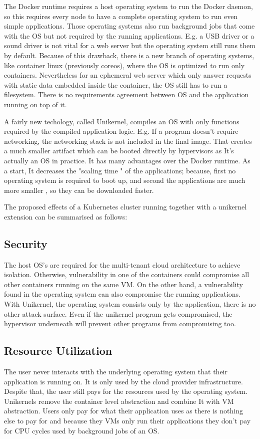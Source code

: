 The Docker runtime requires a host operating system to run the Docker daemon, so this requires every node to have a complete operating system to run even simple applications. Those operating systems also run background jobs that come with the OS but not required by the running applications. E.g. a USB driver or a sound driver is not vital for a web server but the operating system still runs them by default. Because of this drawback, there is a new branch of operating systems, like container linux (previously coreos)\cite{coreos}, where the OS is optimized to run only containers. Nevertheless for an ephemeral web server which only answer requests with static data embedded inside the container, the OS still has to run a filesystem. There is no requirements agreement between OS and the application running on top of it.

A fairly new techology, called Unikernel, compiles an OS with only functions required by the compiled application logic. E.g. If a program doesn't require networking, the networking stack is not included in the final image. That creates a much smaller artifact which can be booted directly by hypervisors as It's actually an OS in practice. It has many advantages over the Docker runtime. As a start, It decreases the "scaling time \cite{Podolskiy:2017:QCA:3069383.3069390}" of the applications; because, first no operating system is required to boot up, and second the applications are much more smaller , so they can be downloaded faster.

The proposed effects of a Kubernetes cluster running together with a unikernel extension can be summarised as follows:

\subsection{Security}
 The host OS's are required for the multi-tenant cloud architecture to achieve isolation. Otherwise, vulnerability in one of the containers could compromise all other containers running on the same VM. On the other hand, a vulnerability found in the operating system can also compromise the running applications. With Unikernel, the operating system consists only by the application, there is no other attack surface. Even if the unikernel program gets compromised, the hypervisor underneath will prevent other programs from compromising too.

\subsection{Resource Utilization}
The user never interacts with the underlying operating system that their application is running on. It is only used by the cloud provider infrastructure. Despite that, the user still pays for the resources used by the operating system. Unikernels remove the container level abstraction and combine It with VM abstraction. Users only pay for what their application uses as there is nothing else to pay for and because they VMs only run their applications they don't pay for CPU cycles used by background jobs of an OS.

